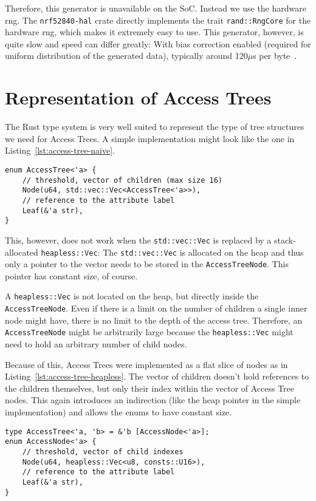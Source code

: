 Therefore, this generator is unavailable on the SoC.
Instead we use the hardware \acrshort{rng}.
The \texttt{nrf52840-hal} crate directly implements the trait \texttt{rand::RngCore} for the hardware \acrshort{rng}, which makes it extremely easy to use.
This generator, however, is quite slow and speed can differ greatly: With bias correction enabled (required for uniform distribution of the generated data), typically around 120$\mu$s per byte~\cite{noauthor_nrf52840_nodate}.


\section{Representation of Access Trees}
The Rust type system is very well suited to represent the type of tree structures we need for Access Trees.
A simple implementation might look like the one in Listing~\ref{lst:access-tree-naive}. 

\begin{lstlisting}[caption={Simple Implementation of Access Trees (using the standard library)},label={lst:access-tree-naive}]
enum AccessTree<'a> {
    // threshold, vector of children (max size 16)
    Node(u64, std::vec::Vec<AccessTree<'a>>),
    // reference to the attribute label
    Leaf(&'a str),
}
\end{lstlisting}

This, however, does not work when the \texttt{std::vec::Vec} is replaced by a stack-allocated \texttt{heapless::Vec}:
The \texttt{std::vec::Vec} is allocated on the heap and thus only a pointer to the vector needs to be stored in the \texttt{AccessTreeNode}.
This pointer has constant size, of course.

A \texttt{heapless::Vec} is not located on the heap, but directly inside the \texttt{AccessTreeNode}.
Even if there is a limit on the number of children a single inner node might have, there is no limit to the depth of the access tree.
Therefore, an \texttt{AccessTreeNode} might be arbitrarily large because the \texttt{heapless::Vec} might need to hold an arbitrary number of child nodes.

Because of this, Access Trees were implemented as a flat slice of nodes as in Listing~\ref{lst:access-tree-heapless}. 
The vector of children doesn't hold references to the children themselves, but only their index within the vector of Access Tree nodes.
This again introduces an indirection (like the heap pointer in the simple implementation) and allows the enums to have constant size.

\begin{lstlisting}[caption={Refined implementation of Access Trees (works without standard library)},label={lst:access-tree-heapless}]
type AccessTree<'a, 'b> = &'b [AccessNode<'a>];
enum AccessNode<'a> {
    // threshold, vector of child indexes
    Node(u64, heapless::Vec<u8, consts::U16>),
    // reference to the attribute label
    Leaf(&'a str),
}
\end{lstlisting}